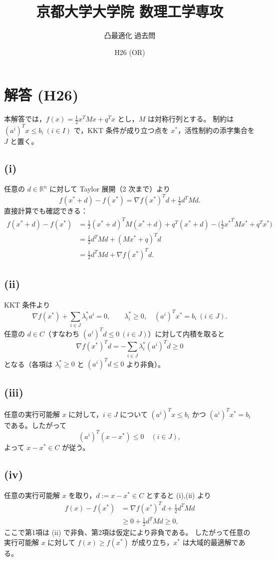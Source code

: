 \documentclass[12pt,a4paper]{article}
\title{京都大学大学院 数理工学専攻}
\author{凸最適化 過去問}
\date{H26 (OR)}
\begin{document}
\maketitle

\section*{解答 (H26)}

本解答では，$f(x)=\tfrac12 x^T M x + q^T x$ とし，$M$ は対称行列とする。
制約は $(a^i)^T x \le b_i\ (i\in I)$ で，KKT 条件が成り立つ点を $x^*$，活性制約の添字集合を $J$ と置く。

\subsection*{(i)}
任意の $d\in\mathbb{R}^n$ に対して Taylor 展開（2 次まで）より
\[
f(x^*+d)-f(x^*) = \nabla f(x^*)^T d + \tfrac12 d^T M d.
\]
直接計算でも確認できる：
\begin{align*}
f(x^*+d)-f(x^*) &= \tfrac12 (x^*+d)^T M (x^*+d) + q^T(x^*+d) - \bigl(\tfrac12 {x^*}^T M x^* + q^T x^*\bigr) \\
&= \tfrac12 d^T M d + (Mx^*+q)^T d \\
&= \tfrac12 d^T M d + \nabla f(x^*)^T d.
\end{align*}

\subsection*{(ii)}
KKT 条件より
\[
\nabla f(x^*) + \sum_{i\in J} \lambda_i^* a^i = 0,\qquad \lambda_i^*\ge0,\quad (a^i)^T x^*=b_i\ (i\in J).
\]
任意の $d\in C$（すなわち $(a^i)^T d\le0\ (i\in J)$）に対して内積を取ると
\[
\nabla f(x^*)^T d = -\sum_{i\in J} \lambda_i^* (a^i)^T d \ge 0
\]
となる（各項は $\lambda_i^*\ge0$ と $(a^i)^T d\le0$ より非負）。

\subsection*{(iii)}
任意の実行可能解 $x$ に対して，$i\in J$ について $(a^i)^T x \le b_i$ かつ $(a^i)^T x^*=b_i$ である。したがって
\[
(a^i)^T(x-x^*)\le 0 \quad (i\in J),
\]
よって $x-x^*\in C$ が従う。

\subsection*{(iv)}
任意の実行可能解 $x$ を取り，$d:=x-x^*\in C$ とすると (i),(ii) より
\begin{align*}
f(x)-f(x^*) &= \nabla f(x^*)^T d + \tfrac12 d^T M d \\
&\ge 0 + \tfrac12 d^T M d \ge 0,
\end{align*}
ここで第1項は (ii) で非負、第2項は仮定により非負である。
したがって任意の実行可能解 $x$ に対して $f(x)\ge f(x^*)$ が成り立ち，$x^*$ は大域的最適解である。
\end{document}
